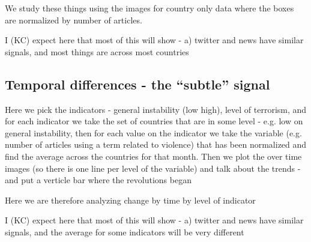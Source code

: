 We study these things using the images for country only data where the boxes are normalized by number of articles.

I (KC) expect here that most of this will show - a) twitter and news have similar signals, and most things are across most countries 

\subsection{Temporal differences - the ``subtle'' signal}
 
Here we pick the indicators - general instability (low high), level of
terrorism, and for each indicator we take the set of countries that are
in some level - e.g. low on general instability, then for each value on
the indicator we take the variable (e.g. number of articles using a term related to violence) that has been normalized and find the average across the countries for that month.  Then we plot the over time images (so there is one line per level of the variable) and talk about the trends - and put a verticle bar where the revolutions began

Here we are therefore analyzing change by time by level of indicator 

I (KC) expect here that most of this will show - a) twitter and news have similar signals, and the average for some indicators will be very different

